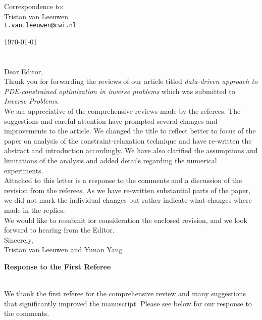 \documentclass[11pt]{article}
\newcommand{\blue}[1]{\textcolor{blue}{#1}}
\begin{document}
\addtocounter{page}{-1}
\thispagestyle{empty}

\hfill
\begin{flushright}
Correspondence to: \\
Tristan van Leeuwen\\
\texttt{t.van.leeuwen@cwi.nl}\\
\end{flushright}

\vspace{1em}
\hfill\today
\ \\
\ \\
\ \\
\noindent Dear Editor,\ \\

\noindent  Thank you for forwarding the reviews of our article
titled \emph{data-driven approach to PDE-constrained optimization in inverse problems} which was submitted to \textit{Inverse Problems}. \ \\

\noindent  We are appreciative of the comprehensive reviews made by the referees. The suggestions and careful attention have prompted several changes and improvements to the article. We changed the title to reflect better to focus of the paper on analysis of the constraint-relaxation technique and have re-written the abstract and introduction accordingly. We have also clarified the assumptions and limitations of the analysis and added details regarding the numerical experiments.\ \\

\noindent Attached to this letter is a response to the comments and a discussion of the revision from the referees. As we have re-written substantial parts of the paper, we did not mark the individual changes but rather indicate what changes where made in the replies. \ \\

\noindent We would like to resubmit for consideration the enclosed revision, and we look forward to hearing from the Editor. \ \\

\noindent  Sincerely, \ \\

\noindent  Tristan van Leeuwen and Yunan Yang



\clearpage

\centerline{\textbf{{\large Response to the First Referee}}}
\ \\
We thank the first referee for the comprehensive review and many suggestions that significantly improved the manuscript. Please see below for our response to the comments. 
\end{document}
